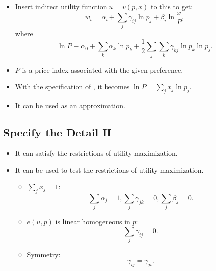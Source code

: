 \documentclass[
]{book}
\providecommand{\tightlist}{%
  \setlength{\itemsep}{0pt}\setlength{\parskip}{0pt}}
\begin{document}
\begin{itemize}
\tightlist
\item
  Insert indirect utility function \(u = v(p, x)\) to this to get:
  \begin{equation}
  w_i = \alpha_i + \sum_{j} \gamma_{ij} \ln p_j + \beta_i \ln \frac{x}{P},
  \end{equation}
  where
  \begin{equation}
  \ln P \equiv  \alpha_0 + \sum_{k} \alpha_k \ln p_k + \frac{1}{2} \sum_{j} \sum_{k} \gamma_{kj} \ln p_k \ln p_j.
  \end{equation}
\item
  \(P\) is a price index associated with the given preference.
\item
  With the specification of \citet{RichardStone1954}, it becomes \(\ln P = \sum_{j} x_j \ln p_j\).
\item
  It can be used as an approximation.
\end{itemize}

\hypertarget{specify-the-detail-ii}{%
\subsection{Specify the Detail II}\label{specify-the-detail-ii}}

\begin{itemize}
\tightlist
\item
  It can satisfy the restrictions of utility maximization.
\item
  It can be used to test the restrictions of utility maximization.

  \begin{itemize}
  \tightlist
  \item
    \(\sum_{j} x_j = 1\):
    \begin{equation}
    \sum_{j} \alpha_j = 1, \sum_{j} \gamma_{jk} = 0, \sum_{j} \beta_j = 0.
    \end{equation}
  \item
    \(e(u, p)\) is linear homogeneous in \(p\):
    \begin{equation}
    \sum_{j} \gamma_{ij} = 0.
    \end{equation}
  \item
    Symmetry:
    \begin{equation}
    \gamma_{ij} = \gamma_{ji}.
    \end{equation}
  \end{itemize}
\end{itemize}
\end{document}
